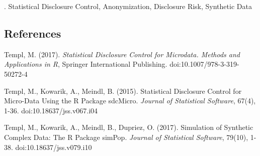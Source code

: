\documentclass[12pt]{article}
\begin{document}
\vskip 2mm

.
Statistical Disclosure Control, 
Anonymization, 
Disclosure Risk, 
Synthetic Data

%        
%
%        

\subsection*{References}

\begin{description}

\item
Templ, M. (2017).
\textit{Statistical Disclosure Control for Microdata.
Methods and Applications in R}, Springer International Publishing. doi:10.1007/978-3-319-50272-4

\item
Templ, M., Kowarik, A., Meindl, B. (2015).
  Statistical Disclosure Control for Micro-Data Using the R Package
  sdcMicro. \textit{Journal of Statistical Software}, 67(4), 1-36.
  doi:10.18637/jss.v067.i04

\item
Templ, M., Kowarik, A., Meindl, B., Dupriez, O.
  (2017). Simulation of Synthetic Complex Data: The R Package simPop.
  \textit{Journal of Statistical Software}, 79(10), 1-38.
  doi:10.18637/jss.v079.i10



\end{description}
\end{document}
